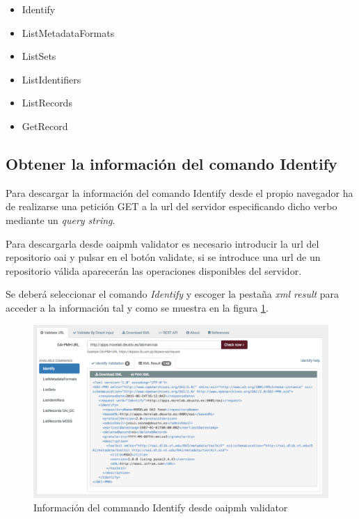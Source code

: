 \begin{itemize}
	\item Identify
	\item ListMetadataFormats
	\item ListSets
	\item ListIdentifiers
	\item ListRecords
	\item GetRecord
\end{itemize}

\subsection{Obtener la información del comando Identify}

Para descargar la información del comando Identify desde el propio navegador ha de realizarse una petición GET a la \acrshort{url} del servidor especificando dicho verbo mediante un \textit{query string}.

Para descargarla desde \acrshort{oaipmh} validator es necesario introducir la \acrshort{url} del repositorio \acrshort{oai} y pulsar en el botón validate, si se introduce una \acrshort{url} de un repositorio válida aparecerán las operaciones disponibles del servidor.

Se deberá seleccionar el comando \textit{Identify} y escoger la pestaña \textit{\acrshort{xml} result} para acceder a la información tal y como se muestra en la figura \ref{fig:download_identify}.

\begin{figure}[!htbp]
	\centering
	\includegraphics[scale=0.31]{fig/download_oai/download_identify}
	\caption{Información del commando Identify desde \acrshort{oaipmh} validator}
	\label{fig:download_identify}
\end{figure}

